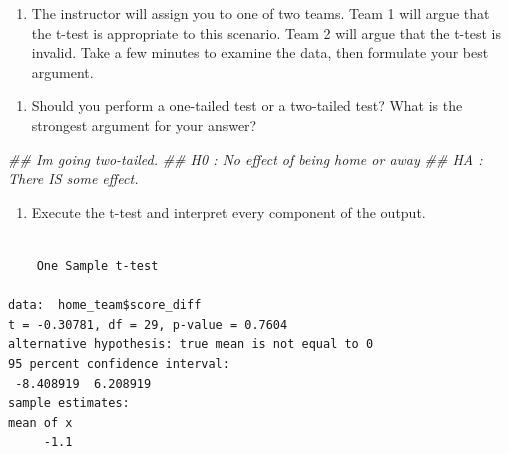 \documentclass[
  letterpaper,
  DIV=11,
  numbers=noendperiod]{scrreprt}
\newenvironment{Shaded}{\begin{snugshade}}{\end{snugshade}}
\newcommand{\AttributeTok}[1]{\textcolor[rgb]{0.40,0.45,0.13}{#1}}
\newcommand{\DecValTok}[1]{\textcolor[rgb]{0.68,0.00,0.00}{#1}}
\newcommand{\DocumentationTok}[1]{\textcolor[rgb]{0.37,0.37,0.37}{\textit{#1}}}
\newcommand{\FunctionTok}[1]{\textcolor[rgb]{0.28,0.35,0.67}{#1}}
\newcommand{\NormalTok}[1]{\textcolor[rgb]{0.00,0.23,0.31}{#1}}
\newcommand{\SpecialCharTok}[1]{\textcolor[rgb]{0.37,0.37,0.37}{#1}}
\newcommand{\StringTok}[1]{\textcolor[rgb]{0.13,0.47,0.30}{#1}}
\providecommand{\tightlist}{%
  \setlength{\itemsep}{0pt}\setlength{\parskip}{0pt}}\usepackage{longtable,booktabs,array}
\begin{document}
\begin{enumerate}
\def\labelenumi{\arabic{enumi}.}
\tightlist
\item
  The instructor will assign you to one of two teams. Team 1 will argue
  that the t-test is appropriate to this scenario. Team 2 will argue
  that the t-test is invalid. Take a few minutes to examine the data,
  then formulate your best argument.
\end{enumerate}

\begin{enumerate}
\def\labelenumi{\arabic{enumi}.}
\setcounter{enumi}{1}
\tightlist
\item
  Should you perform a one-tailed test or a two-tailed test? What is the
  strongest argument for your answer?
\end{enumerate}

\begin{Shaded}
\begin{Highlighting}[]
\DocumentationTok{\#\# I\textquotesingle{}m going two{-}tailed. }
\DocumentationTok{\#\# H0 : No effect of being home or away}
\DocumentationTok{\#\# HA : There IS some effect. }
\end{Highlighting}
\end{Shaded}

\begin{enumerate}
\def\labelenumi{\arabic{enumi}.}
\setcounter{enumi}{2}
\tightlist
\item
  Execute the t-test and interpret every component of the output.
\end{enumerate}

\begin{Shaded}
\end{Shaded}

\begin{verbatim}

    One Sample t-test

data:  home_team$score_diff
t = -0.30781, df = 29, p-value = 0.7604
alternative hypothesis: true mean is not equal to 0
95 percent confidence interval:
 -8.408919  6.208919
sample estimates:
mean of x 
     -1.1 
\end{verbatim}
\end{document}
